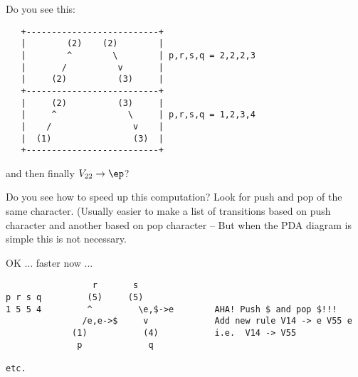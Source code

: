 Do you see this:
\begin{samepage}
\begin{verbatim}
   +--------------------------+
   |        (2)    (2)        |
   |        ^        \        | p,r,s,q = 2,2,2,3
   |       /          v       |
   |     (2)          (3)     |
   +--------------------------+
   |     (2)          (3)     |
   |     ^              \     | p,r,s,q = 1,2,3,4
   |    /                v    |
   |  (1)                (3)  |
   +--------------------------+
\end{verbatim}
\end{samepage}
and then finally $V_{22} \rightarrow \ep$?

Do you see how to speed up this computation? Look for push and pop
of the same character. (Usually easier to make a list of transitions
based on push character and another based on pop character --
But when the PDA diagram is simple this is not necessary.

OK ... faster now ...
\begin{samepage}
\begin{verbatim}
                 r       s
p r s q         (5)     (5)        
1 5 5 4         ^         \e,$->e        AHA! Push $ and pop $!!!
               /e,e->$     v             Add new rule V14 -> e V55 e
             (1)           (4)           i.e.  V14 -> V55
              p             q

etc.
\end{verbatim}
\end{samepage}

